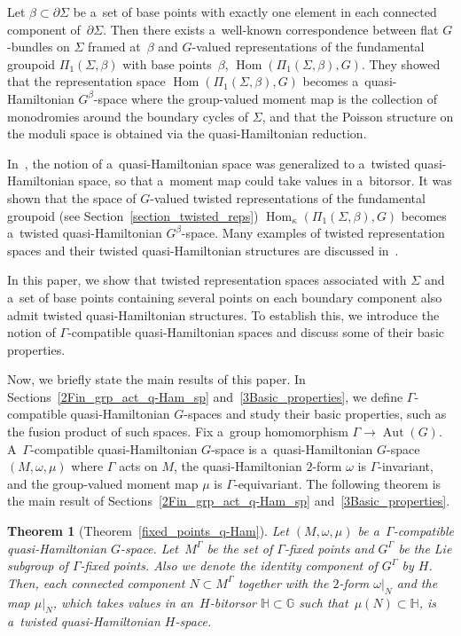 \documentclass[pdftex]{sigma}
\numberwithin{equation}{section}
\newtheorem{Theorem}{Theorem}[section]
\theoremstyle{definition}
\newcommand{\Hom}{\operatorname{Hom}}
\newcommand{\Aut}{\operatorname{Aut}}
\newcommand{\bG}{\mathbb{G}}
\newcommand{\bH}{\mathbb{H}}
\begin{document}
 Let $\beta \subset \partial\Sigma$ be a~set of base points with exactly one element in each connected component of~$\partial \Sigma$.
Then there exists a~well-known correspondence between flat $G$-bundles on $\Sigma$ framed at~$\beta$ and $G$-valued representations of the fundamental groupoid $\Pi_1(\Sigma,\beta)$ with base points~$\beta$,
$\Hom(\Pi_1(\Sigma,\beta),G)$.
They showed that the representation space $\Hom(\Pi_1(\Sigma,\beta),G)$ becomes a~quasi-Hamiltonian $G^{\beta}$-space where the group-valued moment map is the collection of monodromies around the boundary cycles of $\Sigma$,
and that the Poisson structure on the moduli space is obtained via the quasi-Hamiltonian reduction.

In~\cite{B-Y2015,Meinrenken2017}, the notion of a~quasi-Hamiltonian space was generalized to a~twisted quasi-Hamiltonian space, so that a~moment map could take values in a~bitorsor.
It was shown that the space of $G$-valued twisted representations of the fundamental groupoid (see Section~\ref{section_twisted_reps})
$\Hom_{\kappa}(\Pi_1(\Sigma,\beta),G)$
becomes a~twisted quasi-Hamiltonian $G^{\beta}$-space.
Many examples of twisted representation spaces and their twisted quasi-Hamiltonian structures are discussed in~\cite{Zerouali_Ph.D_Thesis,Zerouali}.

 In this paper, we show that twisted representation spaces associated with $\Sigma$ and a~set of base points containing several points on each boundary component also admit twisted quasi-Hamiltonian structures.
To establish this, we introduce the notion of $\Gamma$-compatible quasi-Hamiltonian spaces and discuss some of their basic properties.

Now, we briefly state the main results of this paper.
In Sections~\ref{2Fin_grp_act_q-Ham_sp} and~\ref{3Basic_properties}, we define $\Gamma$-compatible quasi-Hamiltonian $G$-spaces and study their basic properties, such as the fusion product of such spaces.
Fix a~group homomorphism $\Gamma \to \Aut(G)$. A~$\Gamma$-compatible quasi-Hamiltonian $G$-space is a~quasi-Hamiltonian $G$-space $(M, \omega, \mu)$ where $\Gamma$ acts on $M$, the quasi-Hamiltonian $2$-form $\omega$ is $\Gamma$-invariant, and the group-valued moment map $\mu$ is $\Gamma$-equivariant.
The following theorem is the main result of Sections~\ref{2Fin_grp_act_q-Ham_sp} and~\ref{3Basic_properties}.

\begin{Theorem}[Theorem~\ref{fixed_points_q-Ham}]
 Let $(M, \omega, \mu)$ be a~$\Gamma$-compatible quasi-Hamiltonian $G$-space.
 Let~$M^{\Gamma}$ be the set of $\Gamma$-fixed points and $G^{\Gamma}$ be the Lie subgroup of $\Gamma$-fixed points.
 Also we denote the identity component of $G^{\Gamma}$ by $H$.
 Then, each connected component $N \subset M^{\Gamma}$ together with the $2$-form $\omega|_{N}$ and the map $\mu|_{N}$, which takes values in an~$H$-bitorsor $\bH \subset \bG$ such that~${\mu(N) \subset \bH}$, is a~twisted quasi-Hamiltonian $H$-space.
\end{Theorem}
\end{document}
